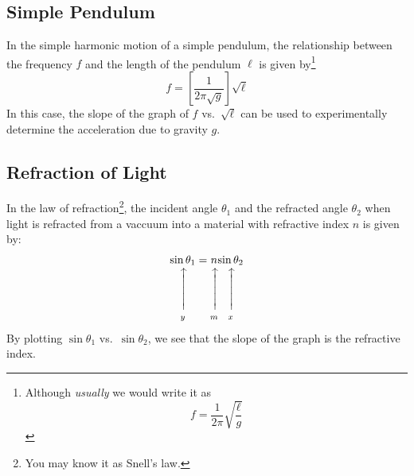 \documentclass{../../oss-handout}
\makeatletter
\newcommand\vertarrowbox[2]{%
    \begin{array}[t]{@{}c@{}} #1 \\
    \rotatebox{90}{$\xrightarrow{\hphantom{abcdefgh}}$} \\[-1ex]
    \mathclap{\scriptstyle\text{#2}}%
    \end{array}}
\makeatother
\begin{document}
\subsection{Simple Pendulum}
In the simple harmonic motion of a simple pendulum, the relationship between
the frequency $f$ and the length of the pendulum $\ell$ is given
by\footnote{Although \emph{usually} we would write it as
  \begin{equation*}
    f=\frac1{2\pi}\sqrt{\frac \ell{g}}
  \end{equation*}
}
\begin{equation}
  f=\left[\frac1{2\pi\sqrt{g}}\right]\sqrt{\ell}
\end{equation}
In this case, the slope of the graph of $f$ vs.\ $\sqrt\ell$ can be used to
experimentally determine the acceleration due to gravity $g$.

\subsection{Refraction of Light}
In the law of refraction\footnote{You may know it as Snell's law.}, the
incident angle $\theta_1$ and the refracted angle $\theta_2$ when light is
refracted from a vaccuum into a material with refractive index $n$ is given
by:
\begin{equation}
  \vertarrowbox{\sin\theta_1}{$y$}=
  \vertarrowbox{n}{$m$}
  \vertarrowbox{\sin\theta_2}{$x$}
\end{equation}
By plotting $\sin\theta_1$ vs.\ $\sin\theta_2$, we see that the slope of the
graph is the refractive index.
\end{document}
